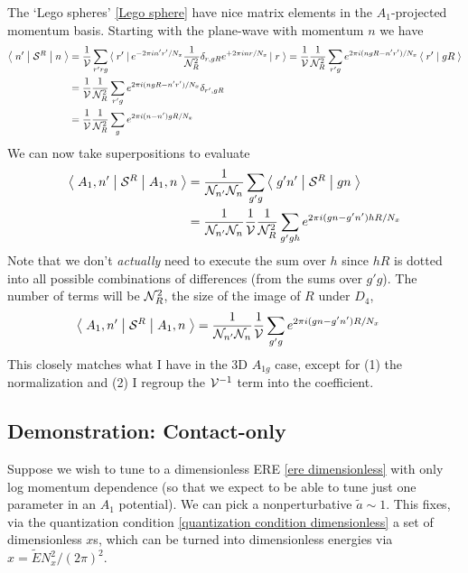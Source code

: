 The `Lego spheres' \eqref{Lego sphere} have nice matrix elements in the $A_1$-projected momentum basis.
Starting with the plane-wave with momentum $n$ we have
\begin{align}
    \left\langle\;n'\;\middle|\;\mathcal{S}^{R}\;\middle|\;n\;\right\rangle
    &=
    \frac{1}{\mathcal{V}} \sum_{r'rg} \left\langle\;r'\;\right| e^{-2\pi i n'r' / N_x} \frac{1}{\mathcal{N}_{R}^2} \delta_{r,gR} e^{+2\pi i nr / N_x} \left|\;r\;\right\rangle
    =
    \frac{1}{\mathcal{V}} \frac{1}{\mathcal{N}_{R}^2} \sum_{r'g} e^{2\pi i (n gR - n'r') / N_x} \left\langle\;r'\;\middle|\;gR\;\right\rangle
    \\
    &=
    \frac{1}{\mathcal{V}} \frac{1}{\mathcal{N}_{R}^2} \sum_{r'g} e^{2\pi i (n gR - n'r') / N_x} \delta_{r',gR}
    \\
    &=
    \frac{1}{\mathcal{V}} \frac{1}{\mathcal{N}_{R}^2} \sum_{g} e^{2\pi i (n-n') gR / N_x}
\end{align}
We can now take superpositions to evaluate
\begin{align}
    \left\langle\;A_1, n'\;\middle|\;\mathcal{S}^{R}\;\middle|\;A_1, n\;\right\rangle
    &=
    \frac{1}{\mathcal{N}_{n'}\mathcal{N}_{n}} \sum_{g'g} \left\langle\;g'n'\;\middle|\;\mathcal{S}^{R}\;\middle|\;gn\;\right\rangle
    \\
    &=
    \frac{1}{\mathcal{N}_{n'}\mathcal{N}_{n}} \frac{1}{\mathcal{V}}\frac{1}{\mathcal{N}_{R}^2} \sum_{g'gh} e^{2\pi i (gn-g'n') hR / N_x}
\end{align}
Note that we don't \emph{actually} need to execute the sum over $h$ since $hR$ is dotted into all possible combinations of differences (from the sums over $g'g$).
The number of terms will be $\mathcal{N}_{R}^2$, the size of the image of $R$ under $D_4$, 
\begin{align}
    \left\langle\;A_1, n'\;\middle|\;\mathcal{S}^{R}\;\middle|\;A_1, n\;\right\rangle
    &=
    \frac{1}{\mathcal{N}_{n'}\mathcal{N}_{n}} \frac{1}{\mathcal{V}} \sum_{g'g} e^{2\pi i (gn-g'n') R / N_x}
\end{align}
This closely matches what I have in the 3D $A_{1g}$ case, except for (1) the normalization and (2) I regroup the $\mathcal{V}^{-1}$ term into the coefficient.

\subsection{Demonstration: Contact-only}

Suppose we wish to tune to a dimensionless ERE \eqref{ere dimensionless} with only log momentum dependence (so that we expect to be able to tune just one parameter in an $A_1$ potential).
We can pick a nonperturbative $\tilde{a} \sim 1$.
This fixes, via the quantization condition \eqref{quantization condition dimensionless} a set of dimensionless $x$s, which can be turned into dimensionless energies via $x=\tilde{E}N_x^2/(2\pi)^2$.

